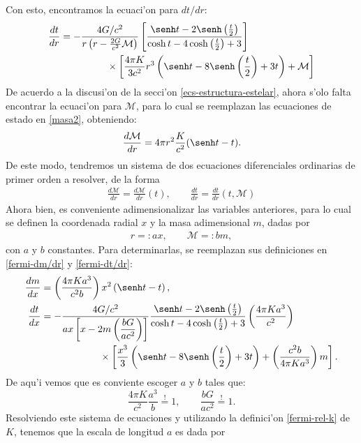Con esto, encontramos la ecuaci'on para $dt/dr$:
\begin{align}
&\frac{dt}{dr}=-\frac{4G/c^2}{r\left(r-\frac{2G}{c^2}\mathcal{M}\right)}\left[\frac{\senh t-2\senh\left(\frac{t}{2}\right)}{\cosh t-4\cosh \left(\frac{t}{2}\right)+3}\right] \nonumber\\
& \qquad\qquad\qquad  \times \left[\frac{4\pi K}{3c^2} r^3\left(\senh t-8\senh \left(\frac{t}{2}\right)+3t\right)+\mathcal{M}\right]\label{fermi-dt/dr}
\end{align}
De acuerdo a la discusi'on de la secci'on \eqref{ecs-estructura-estelar}, ahora s'olo falta encontrar la ecuaci'on para $\mathcal{M}$, para lo cual se reemplazan las ecuaciones de estado en \eqref{masa2}, obteniendo:
\begin{align}
\frac{d\mathcal{M}}{dr}=4\pi r^2\frac{K}{c^2}(\senh t-t)\label{fermi-dm/dr}.
\end{align}
De este modo, tendremos un sistema de dos ecuaciones diferenciales ordinarias de primer orden a resolver, de la forma
\begin{align}
 \frac{d\mathcal{M}}{dr}=\frac{d\mathcal{M}}{dr}(t),\qquad\frac{dt}{dr}=\frac{dt}{dr}(t,\mathcal{M})
\end{align}
Ahora bien, es conveniente adimensionalizar las variables anteriores, para lo cual se definen la coordenada radial $x$ y la masa adimensional $m$, dadas por
\begin{align}
 r=:ax,\qquad \mathcal{M}=:bm,
\end{align}
con $a$ y $b$ constantes. Para determinarlas, se reemplazan sus definiciones en \eqref{fermi-dm/dr} y \eqref{fermi-dt/dr}:
\begin{align}
 \frac{dm}{dx}&=\left(\frac{4\pi Ka^3}{c^2b}\right)x^2\left(\senh t-t\right),\\
\frac{dt}{dx}&=-\frac{4G/c^2}{ax\left[x-2m\left(\dfrac{bG}{ac^2}\right)\right]}\frac{\senh t-2\senh\left(\frac{t}{2}\right)}{\cosh t-4\cosh \left(\frac{t}{2}\right)+3}\left(\frac{4\pi K a^3}{c^2}\right)\nonumber\\
&\qquad\qquad\qquad\times\left[ \frac{x^3}{3}\left(\senh t-8\senh \left(\frac{t}{2}\right)+3t\right)+\left(\frac{c^2b}{4\pi K a^3}\right)m\right].
\end{align}
De aqu'i vemos que es conviente escoger $a$ y $b$ tales que:
\begin{equation}\label{fermi-rel-sust-ayb}
\frac{4\pi K}{c^2}\frac{a^3}{b}\stackrel{!}{=}1,\qquad  \frac{bG}{ac^2}\stackrel{!}{=}1.
\end{equation}
Resolviendo este sistema de ecuaciones y utilizando la definici'on \eqref{fermi-rel-k} de $K$, tenemos que la escala de longitud $a$ es dada por
